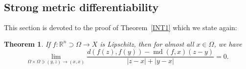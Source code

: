 \documentclass[12pt,leqno]{amsart}
\newtheorem{theorem}{Theorem}
\theoremstyle{definition}
\newtheorem{remark}[theorem]{Remark}
\newcommand{\bbbr}{\mathbb R}
\def\md{\operatorname{md}}
\numberwithin{theorem}{section} \numberwithin{equation}{section}
\begin{document}
\subsection{Strong metric differentiability}
\label{SMD}
This section is devoted to the proof of Theorem~\ref{INT1} which we state again:
\begin{theorem}
\label{T2}
If $f:\bbbr^n\supset\Omega\to X$ is Lipschitz, then for almost all $x\in\Omega$, we have
\begin{equation}
\label{Eq15}
\lim_{\Omega\times\Omega\ni (y,z)\to (x,x)}
\frac{d(f(z),f(y))-\md(f,x)(z-y)}{|z-x|+|y-x|}=0.
\end{equation}
\end{theorem}
\end{document}
